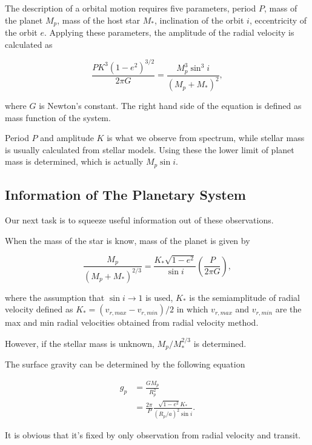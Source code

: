 \documentclass[12pt]{article}
\begin{document}
The description of a orbital motion requires five parameters, period $P$, mass of the planet $M_p$, mass of the host star $M_*$, inclination of the orbit $i$, eccentricity of the orbit $e$. Applying these parameters, the amplitude of the radial velocity is calculated as

\begin{equation}
\frac{P K^3(1-e^2)^{3/2}}{2\pi G} = \frac{M_p^3\sin^3 i}{(M_p+M_*)^2},
\end{equation}

where $G$ is Newton's constant. The right hand side of the equation is defined as mass function of the system.\cite{2013pss3.book..489W}

Period $P$ and amplitude $K$ is what we observe from spectrum, while stellar mass is usually calculated from stellar models. Using these the lower limit of planet mass is determined, which is actually $M_p\sin i$.


\subsection*{Information of The Planetary System}

Our next task is to squeeze useful information out of these observations. 

When the mass of the star is know, mass of the planet is given by 

\begin{equation}
\frac{M_p}{(M_p + M_*)^{2/3}} = \frac{K_* \sqrt{1 - e^2}}{\sin i} \left( \frac{P}{2\pi G} \right) ,
\end{equation}

where the assumption that $\sin i \to 1$ is used, $K_*$ is the semiamplitude of radial velocity defined as $K_* = (v_{r,max} - v_{r,min})/2$ in which $v_{r,max}$ and $v_{r,min}$ are the max and min radial velocities obtained from radial velocity method.

However, if the stellar mass is unknown, $M_p/M_*^{2/3}$ is determined.

The surface gravity can be determined by the following equation \cite{2010arXiv1001.2010W}

\begin{align}
g_p & = \frac{GM_p}{R_p^2} \\
& = \frac{2\pi}{P} \frac{ \sqrt{1 - e^2} K_* }{( R_p/a )^2 \sin i} .
\end{align}

It is obvious that it's fixed by only observation from radial velocity and transit.
\end{document}
